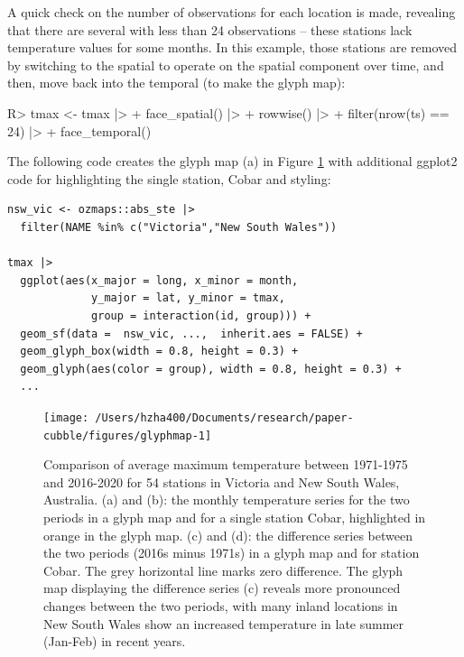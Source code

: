 \documentclass[
  shortnames]{jss}
\begin{document}
A quick check on the number of observations for each location is made, revealing that there are several with less than 24 observations -- these stations lack temperature values for some months. In this example, those stations are removed by switching to the spatial  to operate on the spatial component over time, and then, move back into the temporal  (to make the glyph map):

\begin{CodeChunk}
\begin{CodeInput}
R> tmax <- tmax |> 
+   face_spatial() |> 
+   rowwise() |>
+   filter(nrow(ts) == 24) |>
+   face_temporal()
\end{CodeInput}
\end{CodeChunk}

The following code creates the glyph map (a) in Figure \ref{fig:glyphmap} with additional ggplot2 code for highlighting the single station, Cobar and styling:

\begin{verbatim}
nsw_vic <- ozmaps::abs_ste |> 
  filter(NAME %in% c("Victoria","New South Wales"))

tmax |> 
  ggplot(aes(x_major = long, x_minor = month, 
             y_major = lat, y_minor = tmax,
             group = interaction(id, group))) + 
  geom_sf(data =  nsw_vic, ...,  inherit.aes = FALSE) + 
  geom_glyph_box(width = 0.8, height = 0.3) + 
  geom_glyph(aes(color = group), width = 0.8, height = 0.3) +
  ...
\end{verbatim}

\begin{CodeChunk}
\begin{figure}

{\centering \texttt{[image: /Users/hzha400/Documents/research/paper-cubble/figures/glyphmap-1]} 

}

\caption[Comparison of average maximum temperature between 1971-1975 and 2016-2020 for 54 stations in Victoria and New South Wales, Australia]{Comparison of average maximum temperature between 1971-1975 and 2016-2020 for 54 stations in Victoria and New South Wales, Australia. (a) and (b): the monthly temperature series for the two periods in a glyph map and for a single station Cobar, highlighted in orange in the glyph map. (c) and (d): the difference series between the two periods (2016s minus 1971s) in a glyph map and for station Cobar. The grey horizontal line marks zero difference. The glyph map displaying the difference series (c) reveals more pronounced changes between the two periods, with many inland locations in New South Wales show an increased temperature in late summer (Jan-Feb) in recent years.}\label{fig:glyphmap}
\end{figure}
\end{CodeChunk}
\end{document}
